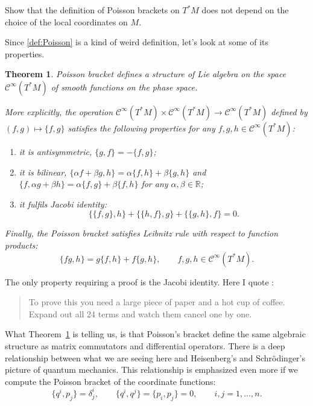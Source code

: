 \documentclass[english,fontsize=11pt,paper=a5,oneside]{scrbook}
\newcommand{\cC}{\mathcal{C}}
\newcommand{\R}{\mathbb{R}}
\newtheorem{theorem}{Theorem}[chapter]
\theoremstyle{definition}
\newenvironment{exercise}
  {\pushQED{\qed}\renewcommand{\qedsymbol}{$\maltese$}\exercisex}
  {\popQED\endexercisex}
\begin{document}
\begin{exercise}
  Show that the definition of Poisson brackets on $T^*M$ does not depend on the choice of the local coordinates on $M$.
\end{exercise}

Since \ref{def:Poisson} is a kind of weird definition, let's look at some of its properties.

\begin{theorem}\label{thm:PoissonLieAlgebra}
  Poisson bracket defines a structure of Lie algebra on the space $\cC^\infty(T^*M)$ of smooth functions on the phase space.

  More explicitly, the operation $\cC^\infty(T^*M)\times \cC^\infty(T^*M) \to \cC^\infty(T^*M)$ defined by $(f,g) \mapsto \big\{f,g\big\}$ satisfies the following properties for any $f,g,h \in \cC^\infty(T^*M)$:
  \begin{enumerate}
    \item it is antisymmetric, $\big\{g,f\big\} = - \big\{f,g\big\}$;
    \item it is bilinear, $\big\{\alpha f + \beta g, h\big\} = \alpha\big\{f,h\big\} + \beta\big\{g,h\big\}$ and $\big\{f, \alpha g + \beta h\big\} = \alpha\big\{f,g\big\} + \beta\big\{f,h\big\}$ for any $\alpha, \beta \in\R$;
    \item it fulfils \emph{Jacobi identity}:
          \begin{equation}\label{eq:JacobiId}
            \big\{\big\{f,g\big\},h\big\} + \big\{\big\{h,f\big\},g\big\} + \big\{\big\{g,h\big\},f\big\} = 0.
          \end{equation}
  \end{enumerate}
  Finally, the Poisson bracket satisfies \emph{Leibnitz rule} with respect to function products:
  \begin{equation}\label{eq:LeibnitzId}
    \big\{fg, h\big\} = g\big\{f, h\big\} + f \big\{g, h\big\}, \qquad f,g,h \in \cC^\infty(T^*M).
  \end{equation}
\end{theorem}

The only property requiring a proof is the Jacobi identity.
Here I quote \cite{lectures:tong}:
\begin{quote}
  To prove this you need a large piece of paper and a hot cup of coffee. Expand out all 24 terms and watch them cancel one by one.
\end{quote}

What Theorem~\ref{thm:PoissonLieAlgebra} is telling us, is that Poisson's bracket define the same algebraic structure as matrix commutators and differential operators.
There is a deep relationship between what we are seeing here and Heisenberg's and Schr\"odinger's picture of quantum mechanics.
This relationship is emphasized even more if we compute the Poisson bracket of the coordinate functions:
\begin{equation}\label{eq:coordcommutators}
  \big\{q^i,p_j\big\} = \delta^i_j, \qquad \big\{q^i,q^j\big\} = \big\{p_i,p_j\big\} = 0, \qquad i,j = 1,\ldots,n.
\end{equation}
\end{document}
